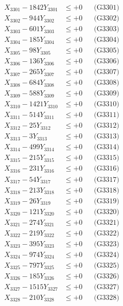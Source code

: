 \documentclass[a4paper,10pt]{article}
\begin{document}
{\begin{align}
\allowbreak
X_{3301} - 1842Y_{3301} &\leq +0 && \text{(G3301)} \\
X_{3302} - 944Y_{3302} &\leq +0 && \text{(G3302)} \\
X_{3303} - 601Y_{3303} &\leq +0 && \text{(G3303)} \\
X_{3304} - 185Y_{3304} &\leq +0 && \text{(G3304)} \\
X_{3305} - 98Y_{3305} &\leq +0 && \text{(G3305)} \\
X_{3306} - 136Y_{3306} &\leq +0 && \text{(G3306)} \\
X_{3307} - 265Y_{3307} &\leq +0 && \text{(G3307)} \\
X_{3308} - 684Y_{3308} &\leq +0 && \text{(G3308)} \\
X_{3309} - 588Y_{3309} &\leq +0 && \text{(G3309)} \\
X_{3310} - 1421Y_{3310} &\leq +0 && \text{(G3310)} \\
\allowbreak
X_{3311} - 514Y_{3311} &\leq +0 && \text{(G3311)} \\
X_{3312} - 25Y_{3312} &\leq +0 && \text{(G3312)} \\
X_{3313} - 3Y_{3313} &\leq +0 && \text{(G3313)} \\
X_{3314} - 499Y_{3314} &\leq +0 && \text{(G3314)} \\
X_{3315} - 215Y_{3315} &\leq +0 && \text{(G3315)} \\
X_{3316} - 231Y_{3316} &\leq +0 && \text{(G3316)} \\
X_{3317} - 54Y_{3317} &\leq +0 && \text{(G3317)} \\
X_{3318} - 213Y_{3318} &\leq +0 && \text{(G3318)} \\
X_{3319} - 26Y_{3319} &\leq +0 && \text{(G3319)} \\
X_{3320} - 121Y_{3320} &\leq +0 && \text{(G3320)} \\
\allowbreak
X_{3321} - 274Y_{3321} &\leq +0 && \text{(G3321)} \\
X_{3322} - 219Y_{3322} &\leq +0 && \text{(G3322)} \\
X_{3323} - 395Y_{3323} &\leq +0 && \text{(G3323)} \\
X_{3324} - 974Y_{3324} &\leq +0 && \text{(G3324)} \\
X_{3325} - 797Y_{3325} &\leq +0 && \text{(G3325)} \\
X_{3326} - 185Y_{3326} &\leq +0 && \text{(G3326)} \\
X_{3327} - 1515Y_{3327} &\leq +0 && \text{(G3327)} \\
X_{3328} - 210Y_{3328} &\leq +0 && \text{(G3328)} \\

\end{align}}
\end{document}
